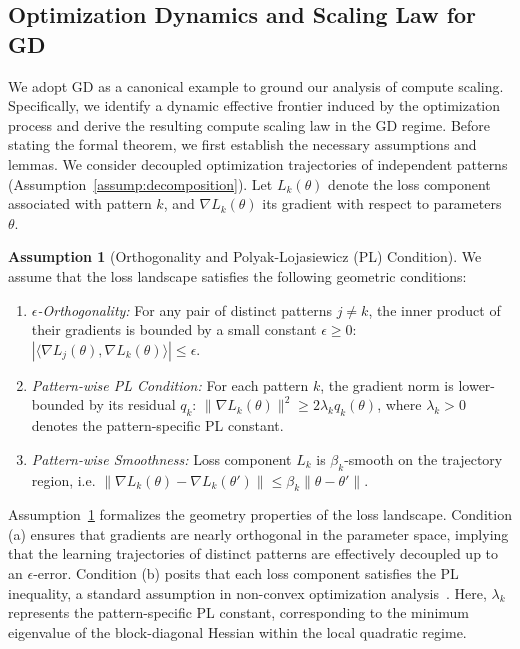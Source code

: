 \documentclass{article}
\theoremstyle{plain}
\theoremstyle{definition}
\newtheorem{assumption}[theorem]{Assumption}
\theoremstyle{remark}
\begin{document}
\subsection{Optimization Dynamics and Scaling Law for GD}\label{sec:sgd_dynamics}
We adopt GD as a canonical example to ground our analysis of compute scaling. Specifically, we identify a dynamic effective frontier induced by the optimization process and derive the resulting compute scaling law in the GD regime. 
Before stating the formal theorem, we first establish the necessary assumptions and lemmas. 
We consider decoupled optimization trajectories of independent patterns (Assumption~\ref{assump:decomposition}).
Let $L_k(\theta)$ denote the loss component associated with pattern $k$, and $\nabla L_k(\theta)$ its gradient with respect to parameters $\theta$.
\begin{assumption}[Orthogonality and Polyak-Lojasiewicz (PL) Condition]
    \label{assump:PL_condition}
    We assume that the loss landscape satisfies the following geometric conditions:
    \begin{enumerate}[label=\textit{(\alph*)}, leftmargin=*]
        \item \textit{$\epsilon$-Orthogonality:} For any pair of distinct patterns $j \neq k$, the inner product of their gradients is bounded by a small constant $\epsilon \ge 0$: $|\langle \nabla L_j(\theta), \nabla L_k(\theta) \rangle| \le \epsilon$.
        \item \textit{Pattern-wise PL Condition:} For each pattern $k$, the gradient norm is lower-bounded by its residual $q_k$: $\|\nabla L_k(\theta)\|^2 \ge 2\lambda_k q_k(\theta)$, where $\lambda_k > 0$ denotes the pattern-specific PL constant.
        \item \textit{Pattern-wise Smoothness:} Loss component $L_k$ is $\beta_k$-smooth on the trajectory region, i.e. $\|\nabla L_k(\theta)-\nabla L_k(\theta')\|\le \beta_k \|\theta-\theta'\|$.

    \end{enumerate}
\end{assumption}
Assumption~\ref{assump:PL_condition} formalizes the geometry properties of the loss landscape. 
Condition (a) ensures that gradients are nearly orthogonal in the parameter space, implying that the learning trajectories of distinct patterns are effectively decoupled up to an $\epsilon$-error.
Condition (b) posits that each loss component satisfies the PL inequality, a standard assumption in non-convex optimization analysis~\citep{polyak1963gradient,lojasiewicz1963topological,karimi2016linear}. 
Here, $\lambda_k$ represents the pattern-specific PL constant, corresponding to the minimum eigenvalue of the block-diagonal Hessian within the local quadratic regime. 
\end{document}
